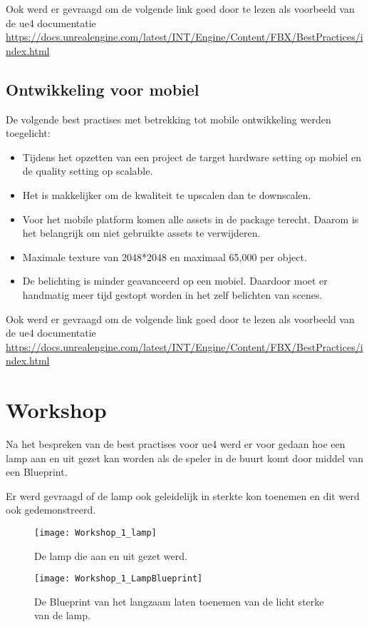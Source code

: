 Ook werd er gevraagd om de volgende link goed door te lezen als voorbeeld van de \gls{ue4} documentatie
\url{https://docs.unrealengine.com/latest/INT/Engine/Content/FBX/BestPractices/index.html}

\subsection{Ontwikkeling voor mobiel}
De volgende best practises met betrekking tot mobile ontwikkeling werden toegelicht:

\begin{itemize}
	\item Tijdens het opzetten van een project de target hardware setting op mobiel en de quality setting op scalable. 
	\item Het is makkelijker om de kwaliteit te upscalen dan te downscalen.
	\item Voor het mobile platform komen alle assets in de package terecht. Daarom is het belangrijk om niet gebruikte assets te verwijderen.
	\item Maximale texture van 2048*2048 en maximaal 65,000 per object.
	\item De belichting is minder geavanceerd op een mobiel. Daardoor moet er handmatig meer tijd gestopt worden in het zelf belichten van scenes.
\end{itemize}

Ook werd er gevraagd om de volgende link goed door te lezen als voorbeeld van de \gls{ue4} documentatie
\url{https://docs.unrealengine.com/latest/INT/Engine/Content/FBX/BestPractices/index.html}

\section{Workshop}
Na het bespreken van de best practises voor \gls{ue4} werd er voor gedaan hoe een lamp aan en uit gezet kan worden als de speler in de buurt komt door middel van een Blueprint. 

Er werd gevraagd of de lamp ook geleidelijk in sterkte kon toenemen en dit werd ook gedemonstreerd.

\begin{figure}[!ht]
  \centering
    \texttt{[image: Workshop\_1\_lamp]}
    \caption{De lamp die aan en uit gezet werd.}
\end{figure}

\begin{figure}[!ht]
  \centering
    \texttt{[image: Workshop\_1\_LampBlueprint]}
    \caption{De Blueprint van het langzaam laten toenemen van de licht sterke van de lamp.}
\end{figure}

